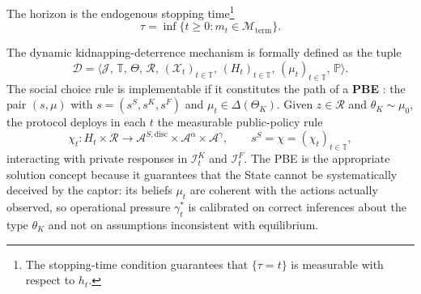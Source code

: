 \documentclass[12pt,a4paper]{article}
\providecommand{\textcite}{\citet}
\theoremstyle{plain}
\theoremstyle{definition}
\theoremstyle{remark}
\newcommand{\ProbE}{\mathbb{P}}
\newcommand{\1}{\mathbf{1}}
\begin{document}
The horizon is the endogenous stopping time\footnote{The stopping-time condition
guarantees that $\{\tau=t\}$ is measurable with respect to $h_t$.}
\begin{equation}
\label{eq:stopping-time}
\tau = \inf \{ t \geq 0 : m_t \in \mathcal{M}_{\mathrm{term}} \}.
\end{equation}

The dynamic kidnapping-deterrence mechanism is formally defined as the tuple
\begin{equation*}
\mathcal{D} =
\bigl\langle \mathcal{J},\, \mathbb{T},\, \Theta,\, \mathcal{R},\,
(\mathcal{X}_t)_{t \in \mathbb{T}},\, (H_t)_{t \in \mathbb{T}},\,
(\mu_t)_{t \in \mathbb{T}},\, \ProbE \bigr\rangle.
\end{equation*}
The social choice rule is implementable if it constitutes the path of a \textbf{PBE}
\textcite{FudenbergTirole1991}: the pair $(s,\mu)$ with $s=(s^S,s^K,s^F)$ and
$\mu_t\in\Delta(\Theta_K)$. Given $z\in\mathcal{R}$ and $\theta_K\sim\mu_0$, the
protocol deploys in each $t$ the measurable public-policy rule
\[
\chi_t \colon H_t\times\mathcal{R} \longrightarrow
\mathcal{A}^{S,\text{disc}} \times \mathcal{A}^{\alpha} \times
\mathcal{A}^{\gamma}, \qquad s^S = \chi = (\chi_t)_{t\in\mathbb{T}},
\]
interacting with private responses in $\mathcal{I}_t^K$ and $\mathcal{I}_t^F$. The PBE
is the appropriate solution concept because it guarantees that the State cannot be
systematically deceived by the captor: its beliefs $\mu_t$ are coherent with the
actions actually observed, so operational pressure $\gamma_t^\ast$ is calibrated on
correct inferences about the type $\theta_K$ and not on assumptions inconsistent with
equilibrium.
\end{document}
